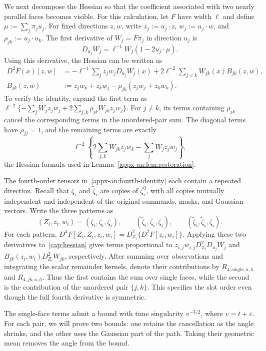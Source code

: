 \documentclass[11pt,letterpaper,twoside,leqno]{article}
\theoremstyle{bookplain}
\theoremstyle{bookremark}
\begin{document}
We next decompose the Hessian so that the coefficient associated
with two nearly parallel faces becomes visible. For this calculation,
let $F$ have width $\ell$ and define $\mu:=\sum_j\pi_j u_j$.
For fixed directions $z,w$, write $z_j:=u_j\cdot z$,
$w_j:=u_j\cdot w$, and $\rho_{jk}:=u_j\cdot u_k$.
The first derivative of $W_j=F\pi_j$ in direction $u_j$ is
\[
 D_{u_j}W_j=\ell^{-1}W_j(1-2u_j\cdot\mu).
\]
Using this derivative, the Hessian can be written as
\begin{align}
 D^2F(x)[z,w]
 &=-\ell^{-1}\sum_jz_jw_j D_{u_j}W_j(x)
     +2\ell^{-2}\sum_{j<k}W_{jk}(x)B_{jk}(z,w),
 \label{cap:hessian}\\
 B_{jk}(z,w)
 &:=z_jw_k+z_kw_j-\rho_{jk}(z_jw_j+z_kw_k).
 \label{cap:pair-coefficient}
\end{align}
To verify the identity, expand the first term as
$\ell^{-2}\{-\sum_jW_jz_jw_j
          +2\sum_{j,k}\rho_{jk}W_{jk}z_jw_j\}$.
For $j\ne k$, its terms containing $\rho_{jk}$ cancel
the corresponding terms in the unordered-pair sum.
The diagonal terms have $\rho_{jj}=1$, and the remaining terms
are exactly
\[
 \ell^{-2}\left\{2\sum_{j,k}W_{jk}z_jw_k
                         -\sum_jW_jz_jw_j\right\},
\]
the Hessian formula used in Lemma~\ref{appx-an:lem:restoration}.

The fourth-order tensors in~\eqref{appx-an:fourth-identity}
each contain a repeated direction. Recall that $\zeta_i$ and
$\widetilde\zeta_i$ are copies of $\zeta_i^0$, with all copies
mutually independent and independent of the original summands,
masks, and Gaussian vectors. Write the three patterns as
\[
 (Z_i,z_i,w_i)
 =(\zeta_i,\zeta_i,\zeta_i),\qquad
   (\widetilde\zeta_i,\zeta_i,\zeta_i),\qquad
   (\widetilde\zeta_i,\widetilde\zeta_i,\zeta_i).
\]
For each pattern,
$D^4F[Z_i,Z_i,z_i,w_i]=D_{Z_i}^2\{D^2F[z_i,w_i]\}$.
Applying these two derivatives to~\eqref{cap:hessian} gives
terms proportional to
$z_{i,j}w_{i,j}D_{Z_i}^2D_{u_j}W_j$ and
$B_{jk}(z_i,w_i)D_{Z_i}^2W_{jk}$, respectively.
After summing over observations and integrating the scalar
remainder kernels, denote their contributions by
$R_{4,\mathrm{single},a,h}$ and $R_{4,jk,a,h}$.
Thus the first contains the sum over single faces, while the
second is the contribution of the unordered pair $\{j,k\}$.
This specifies the slot order even though the full fourth
derivative is symmetric.

The single-face terms admit a bound with time singularity
$v^{-3/2}$, where $v=t+\varepsilon$. For each pair, we will
prove two bounds: one retains the cancellation as the angle
shrinks, and the other uses the Gaussian part of the path.
Taking their geometric mean removes the angle from the bound.
\end{document}
